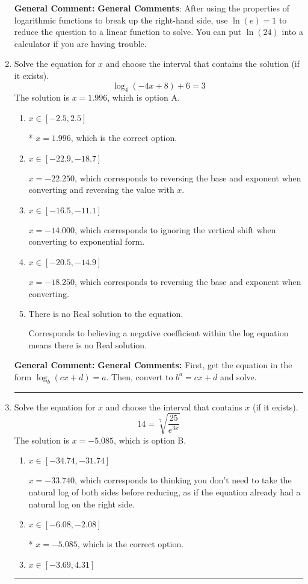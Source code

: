 \documentclass{extbook}[14pt]
\newcommand{\litem}[1]{\item #1

\rule{\textwidth}{0.4pt}}
\begin{document}
\begin{enumerate}
{\textbf{General Comment:} \textbf{General Comments}: After using the properties of logarithmic functions to break up the right-hand side, use $\ln(e) = 1$ to reduce the question to a linear function to solve. You can put $\ln(24)$ into a calculator if you are having trouble.
}
\litem{
Solve the equation for $x$ and choose the interval that contains the solution (if it exists).
\[ \log_{4}{(-4x+8)}+6 = 3 \]The solution is \( x = 1.996 \), which is option A.\begin{enumerate}[label=\Alph*.]
\item \( x \in [-2.5, 2.5] \)

* $x = 1.996$, which is the correct option.
\item \( x \in [-22.9, -18.7] \)

$x = -22.250$, which corresponds to reversing the base and exponent when converting and reversing the value with $x$.
\item \( x \in [-16.5, -11.1] \)

$x = -14.000$, which corresponds to ignoring the vertical shift when converting to exponential form.
\item \( x \in [-20.5, -14.9] \)

$x = -18.250$, which corresponds to reversing the base and exponent when converting.
\item \( \text{There is no Real solution to the equation.} \)

Corresponds to believing a negative coefficient within the log equation means there is no Real solution.
\end{enumerate}

\textbf{General Comment:} \textbf{General Comments:} First, get the equation in the form $\log_b{(cx+d)} = a$. Then, convert to $b^a = cx+d$ and solve.
}
\litem{
 Solve the equation for $x$ and choose the interval that contains $x$ (if it exists).
\[  14 = \sqrt[7]{\frac{25}{e^{3x}}} \]The solution is \( x = -5.085 \), which is option B.\begin{enumerate}[label=\Alph*.]
\item \( x \in [-34.74, -31.74] \)

$x = -33.740$, which corresponds to thinking you don't need to take the natural log of both sides before reducing, as if the equation already had a natural log on the right side.
\item \( x \in [-6.08, -2.08] \)

* $x = -5.085$, which is the correct option.
\item \( x \in [-3.69, 4.31] \)


\end{enumerate}}
\end{enumerate}
\end{document}

